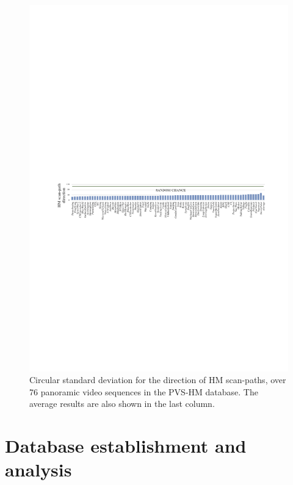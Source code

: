 \documentclass[10pt,journal,compsoc]{IEEEtran}
\begin{document}
\begin{figure}
\vspace{-2em}
	\begin{center}
		\centerline{\includegraphics[width=2\columnwidth]{figures/database/direction-consistence}}%
		\caption{\footnotesize{Circular standard deviation for the direction of HM scan-paths, over 76 panoramic video sequences in the PVS-HM database. The average results are also shown in the last column.}}
		\label{direction-consistence}
	\end{center}
\end{figure}

\section{Database establishment and analysis}
\label{Database_establishment_and_analysis}
\end{document}
